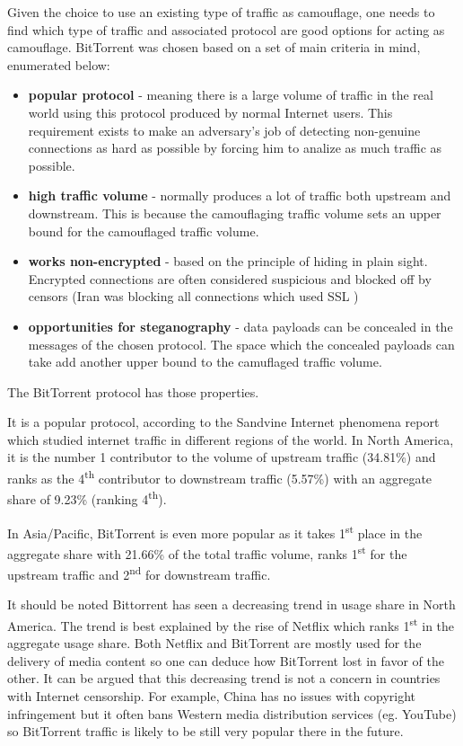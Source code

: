\documentclass[11pt]{book} %
\begin{document}
Given the choice to use an existing type of traffic as camouflage, one needs to find which type of traffic and associated protocol are good options for acting as camouflage. BitTorrent was chosen based on a set of main criteria in mind, enumerated below:

\begin{itemize}
\item \textbf{popular protocol} - meaning there is a large volume of traffic in the real world using this protocol produced by normal Internet users. This requirement exists to make an adversary's job of detecting non-genuine connections as hard as possible by forcing him to analize as much traffic as possible.
\item \textbf{high traffic volume} - normally produces a lot of traffic both upstream and downstream. This is because the camouflaging traffic volume sets an upper bound for the camouflaged traffic volume.
\item \textbf{works non-encrypted} - based on the principle of hiding in plain sight. Encrypted connections are often considered suspicious and blocked off by censors (Iran was blocking all connections which used SSL \citep*{web:iranBlocksEncryptedTraffic})
\item \textbf{opportunities for steganography} - data payloads can be concealed in the messages of the chosen protocol. The space which the concealed payloads can take add another upper bound to the camuflaged traffic volume.

\end{itemize}

The BitTorrent protocol has those properties.

It is a popular protocol, according to the Sandvine Internet phenomena report \citep*{web:sandvineInternet} which studied internet traffic in different regions of the world. In North America, it is the number 1 contributor to the volume of upstream traffic (34.81\%) and ranks as the 4\textsuperscript{th} contributor to downstream traffic (5.57\%) with an aggregate share of 9.23\% (ranking 4\textsuperscript{th}).

In Asia/Pacific, BitTorrent is even more popular as it takes 1\textsuperscript{st} place in the aggregate share with 21.66\% of the total traffic volume, ranks  1\textsuperscript{st} for the upstream traffic and  2\textsuperscript{nd} for downstream traffic.

It should be noted Bittorrent has seen a decreasing trend in usage share in North America. The trend is best explained by the rise of Netflix which ranks 1\textsuperscript{st} in the aggregate usage share. Both Netflix and BitTorrent are mostly used for the delivery of media content so one can deduce how BitTorrent lost in favor of the other. It can be argued that this decreasing trend is not a concern in countries with Internet censorship. For example, China has no issues with copyright infringement but it often bans Western media distribution services (eg. YouTube) so BitTorrent traffic is likely to be still very popular there in the future.
\end{document}
